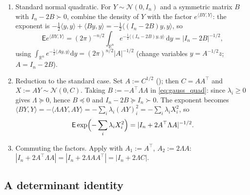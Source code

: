 \documentclass[12pt,a4paper]{article}
\makeatletter
\theoremstyle{definition}
\renewenvironment{proof}[1][\proofname]{\par
  \pushQED{\qed}%
  \normalfont \topsep6\p@\@plus6\p@\relax
  \trivlist
  \item[\hskip\labelsep\bfseries #1\@addpunct{.}]\ignorespaces
}{%
  \popQED\endtrivlist\@endpefalse
}
\newcommand{\R}{\mathbb{R}}
\newcommand{\EE}{\mathsf{E}}
\newcommand{\dd}{\mathrm{d}}
\newcommand{\caln}{\mathcal{N}}
\makeatother
\begin{document}
\begin{proof}
  \leavevmode
  \begin{enumerate}
    \item Standard normal quadratic.  For $Y\sim\caln(0,I_n)$ and a
      symmetric matrix $B$ with $I_n-2B\succ 0$, combine the density of
      $Y$ with the factor $e^{\langle BY,Y\rangle}$: the exponent is
      $-\tfrac12\langle y,y\rangle+\langle By,y\rangle
      =-\tfrac12\langle(I_n-2B)y,y\rangle$, so
      \begin{equation}\label{eq:gauss_quad}
        \EE e^{\langle BY,Y\rangle}
        =(2\pi)^{-n/2}\int_{\R^n}e^{-\frac12\langle(I_n-2B)y,y\rangle}\,\dd y
        =|I_n-2B|^{-1/2},
      \end{equation}
      using $\int_{\R^n}e^{-\frac12\langle Ay,y\rangle}\dd y=(2\pi)^{n/2}|A|^{-1/2}$
      (change variables $y=A^{-1/2}z$; $A=I_n-2B$).

    \item Reduction to the standard case.  Set $A:=C^{1/2}$
      (); then $C=AA^\top$ and $X:=AY\sim\caln(0,C)$.
      Taking $B:=-A^\top\Lambda A$ in \eqref{eq:gauss_quad}: since
      $\lambda_i\geqslant 0$ gives $\Lambda\succcurlyeq 0$, hence $B\preccurlyeq 0$
      and $I_n-2B\succcurlyeq I_n\succ 0$.  The exponent becomes
      $\langle BY,Y\rangle=-\langle\Lambda AY,AY\rangle
      =-\sum_i\lambda_i(AY)_i^2=-\sum_i\lambda_iX_i^2$, so
      \[
        \EE\exp\Bigl(-\sum_i\lambda_iX_i^2\Bigr)
        =|I_n+2A^\top\Lambda A|^{-1/2}.
      \]

    \item Commuting the factors.  Apply  with
      $A_1:=A^\top$, $A_2:=2\Lambda A$:
      $|I_n+2A^\top\Lambda A|=|I_n+2\Lambda AA^\top|=|I_n+2\Lambda C|$.
  \end{enumerate}
\end{proof}


\subsection{A determinant identity}
\end{document}
